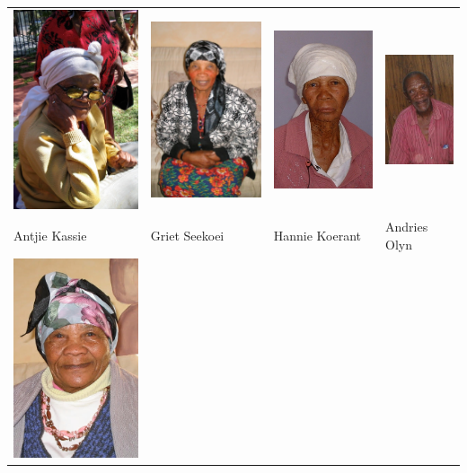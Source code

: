 \begin{tabular}{llll}
    \includegraphics[width=.2\textwidth]{antjie_s.jpg} &
    \includegraphics[width=.2\textwidth]{griet_s.jpg} &
    \includegraphics[width=.2\textwidth]{hannie_s.jpg} &
    \includegraphics[width=.2\textwidth]{andries_s.jpg} \\
    Antjie Kassie & Griet Seekoei & Hannie Koerant & Andries Olyn \\
    \includegraphics[width=.2\textwidth]{hanna_s.jpg} &

\end{tabular}
